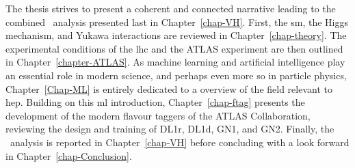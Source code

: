 The thesis strives to present a coherent and connected narrative leading to the combined \vhbc\ analysis presented last in Chapter~\ref{chap-VH}. First, the \gls{sm}, the Higgs mechanism, and Yukawa interactions are reviewed in Chapter~\ref{chap-theory}. The experimental conditions of the \gls{lhc} and the ATLAS experiment are then outlined in Chapter~\ref{chapter-ATLAS}. As machine learning and artificial intelligence play an essential role in modern science, and perhaps even more so in particle physics, Chapter~\ref{Chap-ML} is entirely dedicated to a overview of the field relevant to \gls{hep}. Building on this \gls{ml} introduction, Chapter~\ref{chap-ftag} presents the development of the modern flavour taggers of the ATLAS Collaboration, reviewing the design and training of DL1r, DL1d, GN1, and GN2. Finally, the \vhbc\ analysis is reported in Chapter~\ref{chap-VH} before concluding with a look forward in Chapter~\ref{chap-Conclusion}.